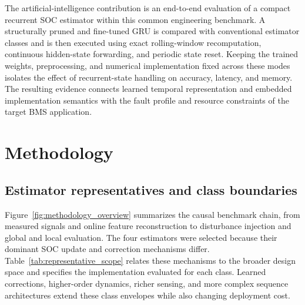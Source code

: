 \documentclass[review,nopreprintline]{elsarticle}
\begin{document}
The artificial-intelligence contribution is an end-to-end evaluation of a compact recurrent SOC estimator within this common engineering benchmark. A structurally pruned and fine-tuned GRU is compared with conventional estimator classes and is then executed using exact rolling-window recomputation, continuous hidden-state forwarding, and periodic state reset. Keeping the trained weights, preprocessing, and numerical implementation fixed across these modes isolates the effect of recurrent-state handling on accuracy, latency, and memory. The resulting evidence connects learned temporal representation and embedded implementation semantics with the fault profile and resource constraints of the target BMS application.

\section{Methodology}
\subsection{Estimator representatives and class boundaries}
Figure~\ref{fig:methodology_overview} summarizes the causal benchmark chain, from measured signals and online feature reconstruction to disturbance injection and global and local evaluation. The four estimators were selected because their dominant SOC update and correction mechanisms differ. Table~\ref{tab:representative_scope} relates these mechanisms to the broader design space and specifies the implementation evaluated for each class. Learned corrections, higher-order dynamics, richer sensing, and more complex sequence architectures extend these class envelopes while also changing deployment cost.
\end{document}
